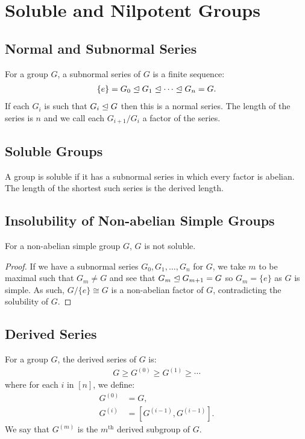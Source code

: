 \section{Soluble and Nilpotent Groups}

\subsection{Normal and Subnormal Series}

For a group $G$, a subnormal series of $G$ is a finite sequence:
\begin{align*}
    \{e\} = G_0 \trianglelefteq G_1 \trianglelefteq \cdots \trianglelefteq G_n = G.
\end{align*} If each $G_i$ is such that $G_i \trianglelefteq G$ then this is a
normal series. The length of the series is $n$ and we call
each $G_{i + 1} / G_i$ a factor of the series.

\subsection{Soluble Groups}

A group is soluble if it has a subnormal series in which every
factor is abelian. The length of the shortest such series is the
derived length.

\subsection{Insolubility of Non-abelian Simple Groups} \label{8.1}

For a non-abelian simple group $G$, $G$ is not soluble.

\begin{proof}
    If we have a subnormal series $G_0, G_1, \ldots, G_n$ for $G$,
    we take $m$ to be maximal such that $G_m \neq G$ and see that
    $G_m \trianglelefteq G_{m + 1} = G$ so $G_m = \{e\}$ as $G$ is simple.
    As such, $G / \{e\} \cong G$ is a non-abelian factor of $G$,
    contradicting the solubility of $G$.
\end{proof}

\subsection{Derived Series}

For a group $G$, the derived series of $G$ is: \begin{align*}
    G \geq G^{(0)} \geq G^{(1)} \geq \cdots
\end{align*} where for each $i$ in $[n]$, we define:
\begin{align*}
    G^{(0)} &= G, \\
    G^{(i)} &= [G^{(i - 1)}, G^{(i - 1)}].
\end{align*} We say that $G^{(m)}$ is the $m^{\text{th}}$ derived
subgroup of $G$.

